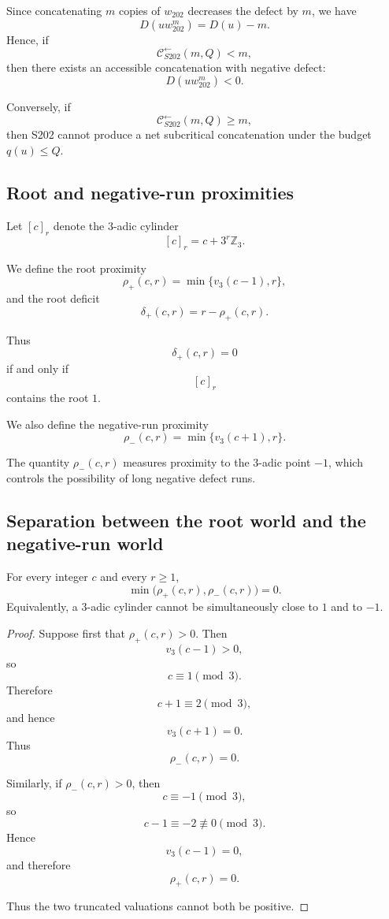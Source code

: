 Since concatenating \(m\) copies of \(w_{202}\) decreases the defect by \(m\),
we have
\[
D(u w_{202}^{m})
=
D(u)-m.
\]
Hence, if
\[
\mathcal C^{\leftarrow}_{S202}(m,Q)<m,
\]
then there exists an accessible concatenation with negative defect:
\[
D(u w_{202}^{m})<0.
\]

Conversely, if
\[
\mathcal C^{\leftarrow}_{S202}(m,Q)\ge m,
\]
then S202 cannot produce a net subcritical concatenation under the budget
\(q(u)\le Q\).

\subsection{Root and negative-run proximities}
\label{subsec:rho-plus-minus}

Let \([c]_r\) denote the \(3\)-adic cylinder
\[
[c]_r=c+3^r\mathbb Z_3.
\]

We define the root proximity
\[
\rho_+(c,r)
=
\min\{v_3(c-1),r\},
\]
and the root deficit
\[
\delta_+(c,r)
=
r-\rho_+(c,r).
\]

Thus
\[
\delta_+(c,r)=0
\]
if and only if
\[
[c]_r
\]
contains the root \(1\).

We also define the negative-run proximity
\[
\rho_-(c,r)
=
\min\{v_3(c+1),r\}.
\]

The quantity \(\rho_-(c,r)\) measures proximity to the \(3\)-adic point
\(-1\), which controls the possibility of long negative defect runs.

\subsection{Separation between the root world and the negative-run world}
\label{subsec:root-negative-separation}

\begin{lemma}
\label{lem:root-negative-separation}
For every integer \(c\) and every \(r\ge1\),
\[
\min\bigl(\rho_+(c,r),\rho_-(c,r)\bigr)=0.
\]
Equivalently, a \(3\)-adic cylinder cannot be simultaneously close to
\(1\) and to \(-1\).
\end{lemma}

\begin{proof}
Suppose first that \(\rho_+(c,r)>0\). Then
\[
v_3(c-1)>0,
\]
so
\[
c\equiv1\pmod3.
\]
Therefore
\[
c+1\equiv2\pmod3,
\]
and hence
\[
v_3(c+1)=0.
\]
Thus
\[
\rho_-(c,r)=0.
\]

Similarly, if \(\rho_-(c,r)>0\), then
\[
c\equiv -1\pmod3,
\]
so
\[
c-1\equiv -2\not\equiv0\pmod3.
\]
Hence
\[
v_3(c-1)=0,
\]
and therefore
\[
\rho_+(c,r)=0.
\]

Thus the two truncated valuations cannot both be positive.
\end{proof}


